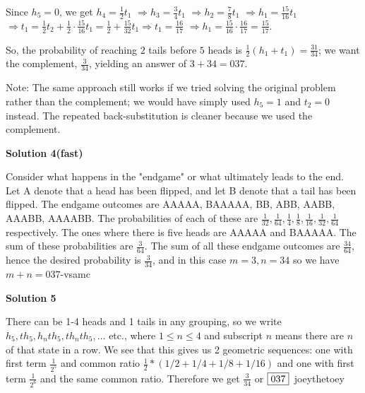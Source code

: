 \begin{enumerate}
 Since $h_{5} = 0$, we get $h_{4} = \frac{1}{2} t_{1}$ $\Rightarrow h_{3} = \frac{3}{4} t_{1}$ $\Rightarrow h_{2} = \frac{7}{8} t_{1}$ $\Rightarrow h_{1} = \frac{15}{16} t_{1}$ $\Rightarrow t_{1} = \frac{1}{2} t_{2} + \frac{1}{2} \cdot \frac{15}{16} t_{1} = \frac{1}{2} + \frac{15}{32} t_{1} \Rightarrow t_{1} = \frac{16}{17}$ $\Rightarrow h_{1} = \frac{15}{16} \cdot \frac{16}{17} = \frac{15}{17}$.

 So, the probability of reaching $2$ tails before $5$ heads is $\frac{1}{2} (h_{1} + t_{1}) = \frac{31}{34}$; we want the complement, $\frac{3}{34}$, yielding an answer of $3 + 34 = \boxed{037}$.

 Note: The same approach still works if we tried solving the original problem rather than the complement; we would have simply used $h_{5} = 1$ and $t_{2} = 0$ instead. The repeated back-substitution is cleaner because we used the complement.

 



\textbf{Solution 4(fast)}

Consider what happens in the "endgame" or what ultimately leads to the end. Let A denote that a head has been flipped, and let B denote that a tail has been flipped. The endgame outcomes are AAAAA, BAAAAA, BB, ABB, AABB, AAABB, AAAABB. The probabilities of each of these are $\frac{1}{32},\frac{1}{64},\frac{1}{4},\frac{1}{8},\frac{1}{16},\frac{1}{32},\frac{1}{64}$ respectively. The ones where there is five heads are AAAAA and BAAAAA. The sum of these probabilities are $\frac{3}{64}$. The sum of all these endgame outcomes are $\frac{34}{64}$, hence the desired probability is $\frac{3}{34}$, and in this case $m=3,n=34$ so we have $m+n=\boxed{037}$-vsamc

 



\textbf{Solution 5}

There can be 1-4 heads and 1 tails in any grouping, so we write $h_5,th_5,h_nth_5,th_nth_5,\ldots$ etc., where $1\leq n\leq 4$ and subscript $n$ means there are $n$ of that state in a row. We see that this gives us 2 geometric sequences: one with first term $\frac{1}{2^5}$ and common ratio $\frac{1}{2}*\left(1/2+1/4+1/8+1/16\right)$ and one with first term $\frac{1}{2^6}$ and the same common ratio. Therefore we get $\frac{3}{34}$ or $\fbox{037}$~joeythetoey

 


\end{enumerate}